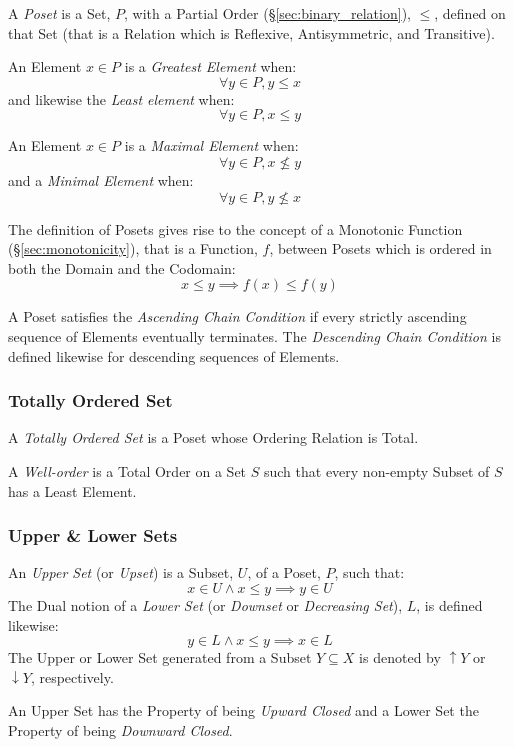 A \emph{Poset} is a Set, $P$, with a Partial Order
(\S\ref{sec:binary_relation}), $\leq$, defined on that Set (that is
a Relation which is Reflexive, Antisymmetric, and Transitive).

An Element $x \in P$ is a \emph{Greatest Element} when:
\[
    \forall y \in P, y \leq x
\]
and likewise the \emph{Least element} when:
\[
    \forall y \in P, x \leq y
\]

An Element $x \in P$ is a \emph{Maximal Element} when:
\[
    \forall y \in P, x \nleq y
\]
and a \emph{Minimal Element} when:
\[
    \forall y \in P, y \nleq x
\]

The definition of Posets gives rise to the concept of a Monotonic
Function (\S\ref{sec:monotonicity}), that is a Function, $f$,
between Posets which is ordered in both the Domain and the Codomain:
\[
    x \leq y \implies f(x) \leq f(y)
\]

A Poset satisfies the \emph{Ascending Chain Condition} if every
strictly ascending sequence of Elements eventually terminates. The
\emph{Descending Chain Condition} is defined likewise for descending
sequences of Elements.



\subsubsection{Totally Ordered Set}\label{sec:total_order}

A \emph{Totally Ordered Set} is a Poset whose Ordering Relation is
Total.

A \emph{Well-order} is a Total Order on a Set $S$ such that every
non-empty Subset of $S$ has a Least Element.



\subsubsection{Upper \& Lower Sets}\label{sec:upper_lower}

An \emph{Upper Set} (or \emph{Upset}) is a Subset, $U$, of a Poset,
$P$, such that:
\[
    x \in U \wedge x \leq y \implies y \in U
\]
The Dual notion of a \emph{Lower Set} (or \emph{Downset} or
\emph{Decreasing Set}), $L$, is defined likewise:
\[
    y \in L \wedge x \leq y \implies x \in L
\]
The Upper or Lower Set generated from a Subset $Y \subseteq X$ is
denoted by $\uparrow Y$ or $\downarrow Y$, respectively.

An Upper Set has the Property of being \emph{Upward Closed} and a
Lower Set the Property of being \emph{Downward Closed}.



